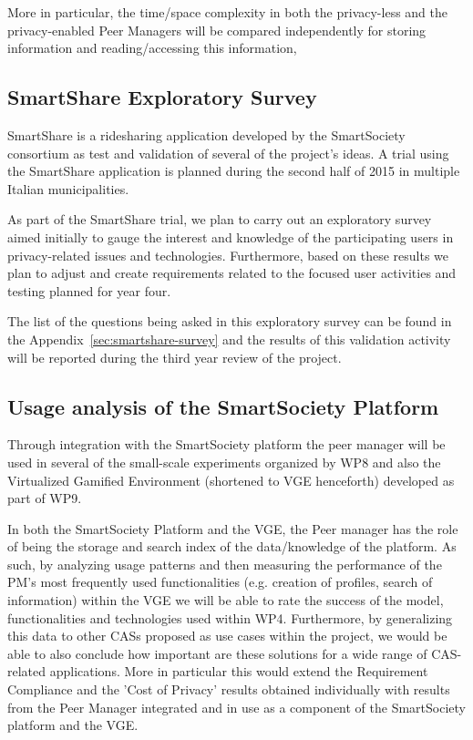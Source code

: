 More in particular, the time/space complexity in both the privacy-less and the privacy-enabled Peer Managers will be compared independently for storing information and reading/accessing this information, 

\subsection{SmartShare Exploratory Survey}
SmartShare is a ridesharing application developed by the SmartSociety consortium as test and validation of several of the project's ideas.  A trial using the SmartShare application is planned during the second half of 2015 in multiple Italian municipalities.  

As part of the SmartShare trial, we plan to carry out an exploratory survey aimed initially to gauge the interest and knowledge of the participating users in privacy-related issues and technologies. Furthermore, based on these results we plan to adjust and create requirements related to the focused user activities and testing planned for year four.
 
The list of the questions being asked in this exploratory survey can be found in the Appendix~\ref{sec:smartshare-survey} and the results of this validation activity will be reported during the third year review of the project.

\subsection{Usage analysis of the SmartSociety Platform}
Through integration with the SmartSociety platform the peer manager will be used in several of the small-scale experiments organized by WP8 and also the Virtualized Gamified Environment (shortened to VGE henceforth) developed as part of WP9.

In both the SmartSociety Platform and the VGE, the Peer manager has the role of being the storage and search index of the data/knowledge of the platform. As such, by analyzing usage patterns and then measuring the performance of the PM's most frequently used functionalities (e.g. creation of profiles, search of information) within the VGE we will be able to rate the success of the model, functionalities and technologies used within WP4. Furthermore, by generalizing this data to other CASs proposed as use cases within the project, we would be able to also conclude how important are these solutions for a wide range of CAS-related applications. More in particular this would extend the Requirement Compliance and the 'Cost of Privacy' results obtained individually with results from the Peer Manager integrated and in use as a component of the SmartSociety platform and the VGE. 

